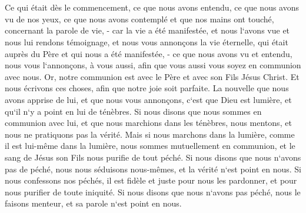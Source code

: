 

\chapter{}

\verse Ce qui était dès le commencement, ce que nous avons entendu, ce que nous avons vu de nos yeux, ce que nous avons contemplé et que nos mains ont touché, concernant la parole de vie, - 
\verse car la vie a été manifestée, et nous l`avons vue et nous lui rendons témoignage, et nous vous annonçons la vie éternelle, qui était auprès du Père et qui nous a été manifestée, - 
\verse ce que nous avons vu et entendu, nous vous l`annonçons, à vous aussi, afin que vous aussi vous soyez en communion avec nous. Or, notre communion est avec le Père et avec son Fils Jésus Christ. 
\verse Et nous écrivons ces choses, afin que notre joie soit parfaite. 
\verse La nouvelle que nous avons apprise de lui, et que nous vous annonçons, c`est que Dieu est lumière, et qu`il n`y a point en lui de ténèbres. 
\verse Si nous disons que nous sommes en communion avec lui, et que nous marchions dans les ténèbres, nous mentons, et nous ne pratiquons pas la vérité. 
\verse Mais si nous marchons dans la lumière, comme il est lui-même dans la lumière, nous sommes mutuellement en communion, et le sang de Jésus son Fils nous purifie de tout péché. 
\verse Si nous disons que nous n`avons pas de péché, nous nous séduisons nous-mêmes, et la vérité n`est point en nous. 
\verse Si nous confessons nos péchés, il est fidèle et juste pour nous les pardonner, et pour nous purifier de toute iniquité. 
\verse Si nous disons que nous n`avons pas péché, nous le faisons menteur, et sa parole n`est point en nous. 

\chapter{}

